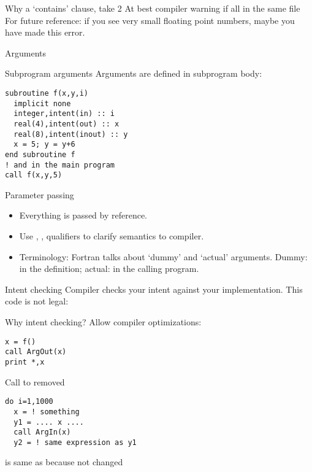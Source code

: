 \begin{block}{Why a `contains' clause, take 2}
  \label{sl:whycontain_type}
  At best compiler warning if all in the same file\\
  For future reference: if you see very small floating point numbers,
  maybe you have made this error.
\end{block}

 {Arguments}

\begin{block}{Subprogram arguments}
  \label{sl:farguments}
 Arguments are defined in subprogram body:
\begin{verbatim}
subroutine f(x,y,i)
  implicit none
  integer,intent(in) :: i
  real(4),intent(out) :: x
  real(8),intent(inout) :: y
  x = 5; y = y+6
end subroutine f
! and in the main program
call f(x,y,5)
\end{verbatim}
\end{block}

\begin{block}{Parameter passing}
  \label{sl:fpassing}
  \begin{itemize}
  \item Everything is passed by reference.
  \item Use , ,  qualifiers to clarify semantics
    to compiler.
  \item Terminology: Fortran talks about `dummy' and `actual'
    arguments. Dummy: in the definition; actual: in the calling program.
  \end{itemize}
\end{block}

\begin{block}{Intent checking}
  \label{sl:fintent}
  Compiler checks your intent against your implementation. This code
  is not legal:

\end{block}

\begin{block}{Why intent checking?}
\label{sl:intentwhy}
Allow compiler optimizations:

\begin{multicols}{2}
\begin{verbatim}
x = f()
call ArgOut(x)
print *,x
\end{verbatim}
Call to  removed
\vfill\columnbreak
\begin{verbatim}
do i=1,1000
  x = ! something
  y1 = .... x ....
  call ArgIn(x)
  y2 = ! same expression as y1
\end{verbatim}
 is same as  because  not changed
\end{multicols}

\end{block}

